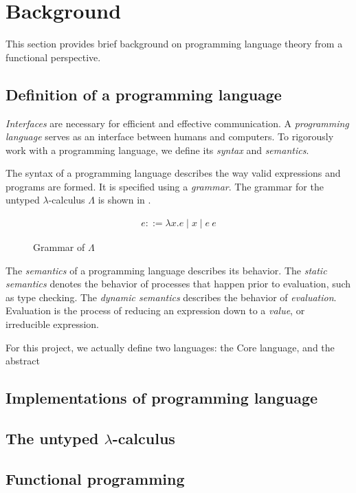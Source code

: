 \section{Background}
\label{sec:background}

This section provides brief background on programming language theory from a functional perspective.

\subsection{Definition of a programming language}
\label{sec:pl-definition}

\textit{Interfaces} are necessary for efficient and effective communication. A \textit{programming language} serves as an interface between humans and computers. To rigorously work with a programming language, we define its \textit{syntax} and \textit{semantics}.

The syntax of a programming language describes the way valid expressions and programs are formed. It is specified using a \textit{grammar}. The grammar for the untyped $\lambda$-calculus $\Lambda$ is shown in .

\begin{figure}
  \centering
  \begin{align*}
    e ::= \lambda x.e \mid x \mid e\ e
  \end{align*}
  \caption{Grammar of $\Lambda$}
  \label{fig:ulc-grammar}
\end{figure}

The \textit{semantics} of a programming language describes its behavior. The \textit{static semantics} denotes the behavior of processes that happen prior to evaluation, such as type checking. The \textit{dynamic semantics} describes the behavior of \textit{evaluation}. Evaluation is the process of reducing an expression down to a \textit{value}, or irreducible expression.

For this project, we actually define two languages: the Core language, and the abstract 

\subsection{Implementations of programming language}
\label{sec:pl-implementation}


\subsection{The untyped $\lambda$-calculus}
\label{sec:ulc}

\subsection{Functional programming}
\label{sec:fp}


